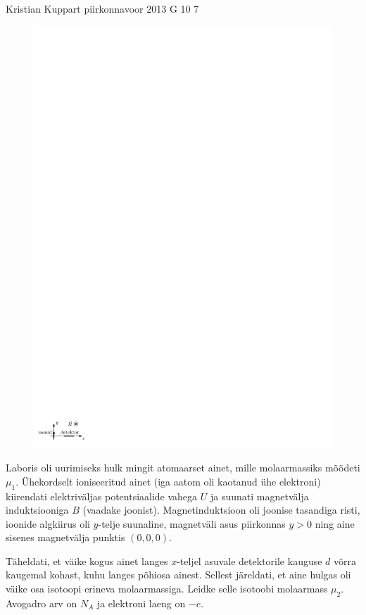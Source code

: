 {Kristian Kuppart} %
{piirkonnavoor} %
{2013} %
{G 10} %
{7} %
{
\ifStatement
\begin{figure}%
\includegraphics[width=\linewidth]{2013-v2g-10-massspektromeeter_ipe}%
\end{figure}
Laboris oli uurimiseks hulk mingit atomaarset ainet, mille molaarmassiks mõõdeti
$\mu_{1}$. Ühekordselt ioniseeritud ainet (iga aatom oli kaotanud ühe
elektroni) kiirendati elektriväljas potentsiaalide vahega $U$ ja suunati magnetvälja
induktsiooniga $B$ (vaadake joonist). Magnetinduktsioon oli joonise tasandiga
risti, 
ioonide algkiirus oli $y$-telje suunaline,
magnetväli asus piirkonnas $y>0$ ning aine sisenes magnetvälja punktis
$(0, 0, 0)$.

Täheldati, et väike kogus ainet langes $x$-teljel asuvale
detektorile kauguse
$d$ võrra kaugemal kohast, kuhu langes põhiosa ainest. Sellest järeldati,
et aine hulgas oli väike osa isotoopi erineva molaarmassiga. Leidke
selle isotoobi molaarmass $\mu_{2}$. Avogadro arv on $N_A$ ja elektroni laeng
on $-e$.
\fi


}
